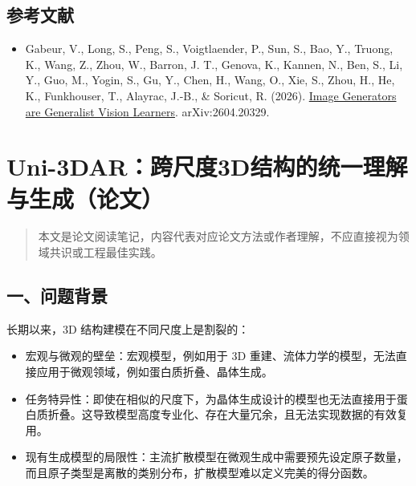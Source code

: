 \hypertarget{ux53c2ux8003ux6587ux732e-201}{%
\subsection{参考文献}\label{ux53c2ux8003ux6587ux732e-201}}

\begin{itemize}
\tightlist
\item
  Gabeur, V., Long, S., Peng, S., Voigtlaender, P., Sun, S., Bao, Y., Truong, K., Wang, Z., Zhou, W., Barron, J. T., Genova, K., Kannen, N., Ben, S., Li, Y., Guo, M., Yogin, S., Gu, Y., Chen, H., Wang, O., Xie, S., Zhou, H., He, K., Funkhouser, T., Alayrac, J.-B., \& Soricut, R. (2026). \href{https://arxiv.org/abs/2604.20329}{Image Generators are Generalist Vision Learners}. arXiv:2604.20329.
\end{itemize}

\clearpage

\hypertarget{uni-3darux8de8ux5c3aux5ea63dux7ed3ux6784ux7684ux7edfux4e00ux7406ux89e3ux4e0eux751fux6210ux8bbaux6587}{%
\section{Uni-3DAR：跨尺度3D结构的统一理解与生成（论文）}\label{uni-3darux8de8ux5c3aux5ea63dux7ed3ux6784ux7684ux7edfux4e00ux7406ux89e3ux4e0eux751fux6210ux8bbaux6587}}

\begin{quote}
本文是论文阅读笔记，内容代表对应论文方法或作者理解，不应直接视为领域共识或工程最佳实践。
\end{quote}

\hypertarget{ux4e00ux95eeux9898ux80ccux666f-16}{%
\subsection{一、问题背景}\label{ux4e00ux95eeux9898ux80ccux666f-16}}

长期以来，3D 结构建模在不同尺度上是割裂的：

\begin{itemize}
\tightlist
\item
  宏观与微观的壁垒：宏观模型，例如用于 3D 重建、流体力学的模型，无法直接应用于微观领域，例如蛋白质折叠、晶体生成。
\item
  任务特异性：即使在相似的尺度下，为晶体生成设计的模型也无法直接用于蛋白质折叠。这导致模型高度专业化、存在大量冗余，且无法实现数据的有效复用。
\item
  现有生成模型的局限性：主流扩散模型在微观生成中需要预先设定原子数量，而且原子类型是离散的类别分布，扩散模型难以定义完美的得分函数。
\end{itemize}

